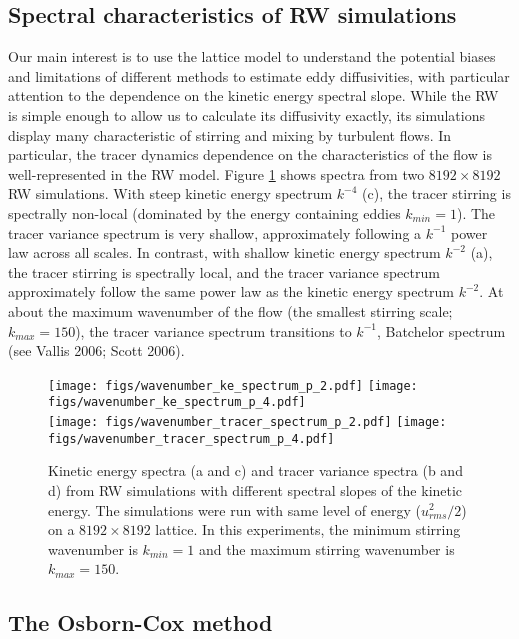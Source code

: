 \documentclass[11pt]{article}
\begin{document}
\subsection{Spectral characteristics of RW simulations}
Our main interest is to use the lattice model to understand the potential biases and limitations of different methods
to estimate eddy diffusivities, with particular attention to the dependence on the kinetic energy spectral slope. While the
RW is simple enough to allow us to calculate its diffusivity exactly, its simulations display many characteristic of stirring
and mixing by turbulent flows. In particular, the tracer dynamics dependence on the characteristics of the flow is well-represented in the RW model. Figure \ref{Spectra8192} shows spectra from two $8192\times8192$ RW simulations.
With steep kinetic energy spectrum $k^{-4}$ (c), the tracer stirring is spectrally non-local (dominated by the energy containing eddies $k_{min} = 1$). The tracer variance spectrum is very shallow, approximately following a $k^{-1}$ power law across all
scales. In contrast, with shallow kinetic energy spectrum $k^{-2}$ (a), the tracer stirring is spectrally local, and the tracer variance spectrum approximately follow the same power law as the kinetic energy spectrum $k^{-2}$. At about the maximum wavenumber of the flow (the smallest stirring scale; $k_{max}=150$), the tracer variance spectrum transitions to $k^{-1}$,
Batchelor spectrum (see Vallis 2006; Scott 2006).

\begin{figure}[ht]
    \centering
       \texttt{[image: figs/wavenumber\_ke\_spectrum\_p\_2.pdf]}
       \texttt{[image: figs/wavenumber\_ke\_spectrum\_p\_4.pdf]}\\
       \texttt{[image: figs/wavenumber\_tracer\_spectrum\_p\_2.pdf]}
       \texttt{[image: figs/wavenumber\_tracer\_spectrum\_p\_4.pdf]}
       \caption{\small Kinetic energy spectra (a and c) and tracer variance spectra (b and d)  from RW simulations with different
       				spectral slopes of the kinetic energy. The simulations were run with same level of energy ($u_{rms}^2/2$)
				on a $8192\times8192$ lattice. In this experiments, the minimum stirring wavenumber is $k_{min}=1$ and
				the maximum stirring wavenumber is $k_{max}=150$.}
		    \label{Spectra8192}
\end{figure}


\subsection{The Osborn-Cox method}
 
\end{document}
